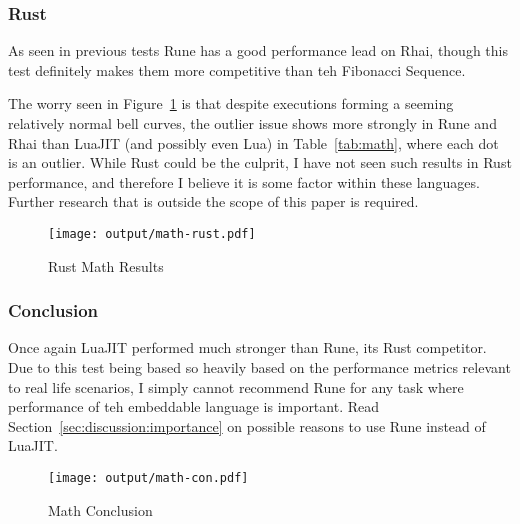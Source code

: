 \subsubsection{Rust}
As seen in previous tests Rune has a good performance lead on Rhai, though this test definitely makes them more competitive than teh Fibonacci Sequence.

The worry seen in Figure~\ref{fig:math-rust} is that despite executions forming a seeming relatively normal bell curves, the outlier issue shows more strongly in Rune and Rhai than LuaJIT (and possibly even Lua) in Table~\ref{tab:math}, where each dot is an outlier. While Rust could be the culprit, I have not seen such results in Rust performance, and therefore I believe it is some factor within these languages. Further research that is outside the scope of this paper is required.

\begin{figure}[H]
	\centering
		\texttt{[image: output/math-rust.pdf]}
	\caption{Rust Math Results}
	\label{fig:math-rust}
\end{figure}

\subsubsection{Conclusion}
Once again LuaJIT performed much stronger than Rune, its Rust competitor. Due to this test being based so heavily based on the performance metrics relevant to real life scenarios, I simply cannot recommend Rune for any task where performance of teh embeddable language is important. Read Section~\ref{sec:discussion:importance} on possible reasons to use Rune instead of LuaJIT.

\begin{figure}[H]
	\centering
		\texttt{[image: output/math-con.pdf]}
	\caption{Math Conclusion}
	\label{fig:math-con}
\end{figure}

